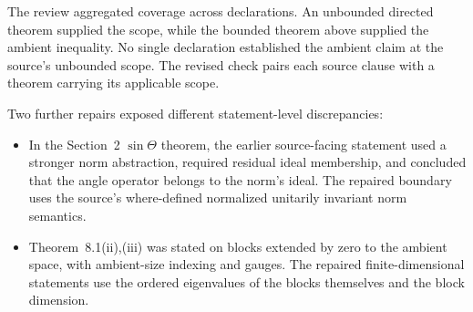 \documentclass{article}
\newenvironment{nolinenumbers}{}{}
\begin{document}
\begin{nolinenumbers}
\begin{minipage}{\linewidth}

\end{minipage}
\end{nolinenumbers}

The review aggregated coverage across declarations.  An unbounded directed theorem
supplied the scope, while the bounded theorem above supplied the ambient inequality.
No single declaration established the ambient claim at the source's unbounded
scope.  The revised check pairs each source clause with a theorem carrying its
applicable scope.

Two further repairs exposed different statement-level discrepancies:
\begin{itemize}
\setlength{\itemsep}{0.15em}
\item In the Section~2 $\sin\Theta$ theorem, the earlier source-facing statement
used a stronger norm abstraction, required residual ideal membership, and concluded
that the angle operator belongs to the norm's ideal.  The repaired boundary uses the source's
where-defined normalized unitarily invariant norm semantics.
\item Theorem~8.1(ii),(iii) was stated on blocks extended by zero to the ambient
space, with ambient-size indexing and gauges.  The repaired finite-dimensional
statements use the ordered eigenvalues of the blocks themselves and the block
dimension.
\end{itemize}
\end{document}
